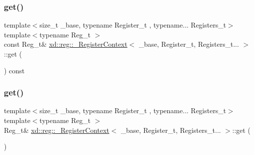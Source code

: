\subsubsection{\texorpdfstring{get()}{get()}\hspace{0.1cm}{\footnotesize\ttfamily [1/2]}}
{\footnotesize\ttfamily template$<$size\+\_\+t \+\_\+base, typename Register\+\_\+t , typename... Registers\+\_\+t$>$ \\
template$<$typename Reg\+\_\+t $>$ \\
const Reg\+\_\+t\& \mbox{\hyperlink{classxd_1_1reg_1_1___register_context}{xd\+::reg\+::\+\_\+\+Register\+Context}}$<$ \+\_\+base, Register\+\_\+t, Registers\+\_\+t... $>$\+::get (\begin{DoxyParamCaption}{ }\end{DoxyParamCaption}) const\hspace{0.3cm}{\ttfamily [inline]}}

\mbox{\label{classxd_1_1reg_1_1___register_context_3_01__base_00_01_register__t_00_01_registers__t_8_8_8_01_4_a7761459e14d2e840cf08b6c70b2b67b1}} 
\subsubsection{\texorpdfstring{get()}{get()}\hspace{0.1cm}{\footnotesize\ttfamily [2/2]}}
{\footnotesize\ttfamily template$<$size\+\_\+t \+\_\+base, typename Register\+\_\+t , typename... Registers\+\_\+t$>$ \\
template$<$typename Reg\+\_\+t $>$ \\
Reg\+\_\+t\& \mbox{\hyperlink{classxd_1_1reg_1_1___register_context}{xd\+::reg\+::\+\_\+\+Register\+Context}}$<$ \+\_\+base, Register\+\_\+t, Registers\+\_\+t... $>$\+::get (\begin{DoxyParamCaption}{ }\end{DoxyParamCaption})\hspace{0.3cm}{\ttfamily [inline]}}

